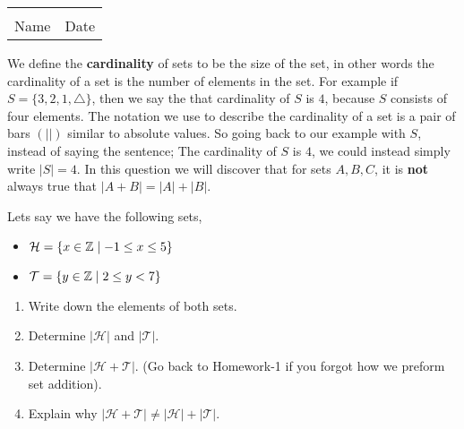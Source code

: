 \documentclass[12pt]{article} %
\begin{document}
	\begin{center}
	\noindent\begin{tabular}{ll}
		\makebox[3in]{\hrulefill} & \makebox[3in]{\hrulefill}\\
		Name & Date\\[8ex]%
	\end{tabular}
	\end{center}
	\newpage



\begin{qstn}
  We define the \textbf{cardinality} of sets to be the size of the set, in other words the cardinality of a set is the number of
  elements in the set. For example if $S = \{3,2,1,\triangle \} $, then we say the that cardinality of $S$ is $4$, because  $S$ 
  consists of four elements. The notation we use to describe the cardinality of a set is a pair of bars $(\left|\right|)$ similar to absolute
  values. So going back to our example with  $S$, instead of saying the sentence; The cardinality of  $S$ is $4$, we could
  instead simply write $\left|S\right| = 4$. In this question we will discover that for sets $A,B,C$, it is \textbf{not} always
  true that $\left|A + B\right| = \left|A\right| + \left|B\right|$.

  Lets say we have the following sets,
  \begin{itemize}
    \item $\mathcal{H} = \{x\in \mathbb Z \mid -1 \leq x \leq 5\} $
    \item $\mathcal{T} = \{y\in \mathbb Z \mid  2 \leq y < 7\} $
  \end{itemize}
  

  \begin{enumerate}[label=(\alph*)]
    \item Write down the elements of both sets.
    \item Determine $|\mathcal{H}|$ and $|\mathcal{T}|$.
    \item Determine $|\mathcal{H + T}|$. (Go back to Homework-1 if you forgot how we preform set addition).
    \item Explain why $|\mathcal{H + T}| \neq |\mathcal{H}| + |\mathcal{T}|$.
  \end{enumerate}
\end{qstn}
\end{document}
